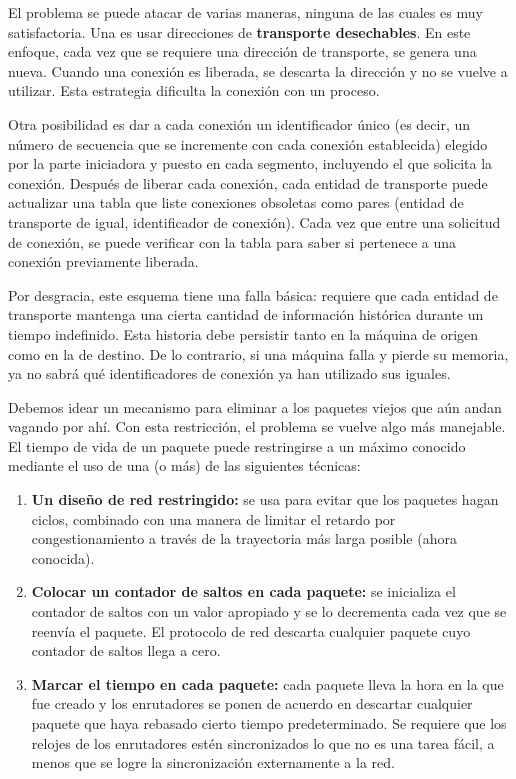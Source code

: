 \documentclass[10pt,a4paper]{report}
\begin{document}
	\par El problema se puede atacar de varias maneras, ninguna de las cuales es muy satisfactoria. Una es usar direcciones de \textbf{transporte desechables}. En este enfoque, cada vez que se requiere una dirección de transporte, se genera una nueva. Cuando una conexión es liberada, se descarta la dirección y no se vuelve a utilizar. Esta estrategia dificulta la conexión con un proceso.

	\par Otra posibilidad es dar a cada conexión un identificador único (es decir, un número de secuencia que se incremente con cada conexión establecida) elegido por la parte iniciadora y puesto en cada segmento, incluyendo el que solicita la conexión. Después de liberar cada conexión, cada entidad de transporte puede actualizar una tabla que liste conexiones obsoletas como pares (entidad de transporte de igual, identificador de conexión). Cada vez que entre una solicitud de conexión, se puede verificar con la tabla para saber si pertenece a una conexión previamente liberada.

	\par Por desgracia, este esquema tiene una falla básica: requiere que cada entidad de transporte mantenga una cierta cantidad de información histórica durante un tiempo indefinido. Esta historia debe persistir tanto en la máquina de origen como en la de destino. De lo contrario, si una máquina falla y pierde su memoria, ya no sabrá qué identificadores de conexión ya han utilizado sus iguales.

	\par Debemos idear un mecanismo para eliminar a los paquetes viejos que aún andan vagando por ahí. Con esta restricción, el problema se vuelve algo más manejable.
El tiempo de vida de un paquete puede restringirse a un máximo conocido mediante el uso de una (o más) de las siguientes técnicas:

	\begin{enumerate}
		\item \textbf{Un diseño de red restringido:} se usa para evitar que los paquetes hagan ciclos, combinado con una manera de limitar el retardo por congestionamiento a través de la trayectoria más larga posible (ahora conocida).
		\item \textbf{Colocar un contador de saltos en cada paquete:} se inicializa el contador de saltos con un valor apropiado y se lo decrementa cada vez que se reenvía el paquete. El protocolo de red descarta cualquier paquete cuyo contador de saltos llega a cero.
		\item \textbf{Marcar el tiempo en cada paquete:} cada paquete lleva la hora en la que fue creado y los enrutadores se ponen de acuerdo en descartar cualquier paquete que haya rebasado cierto tiempo predeterminado. Se requiere que los relojes de los enrutadores estén sincronizados lo que no es una tarea fácil, a menos que se logre la sincronización externamente a la red.
	\end{enumerate}
\end{document}
